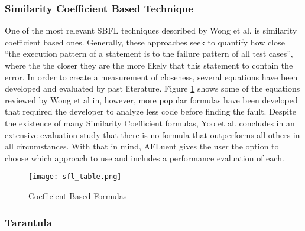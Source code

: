 \subsubsection{Similarity Coefficient Based Technique}
\label{subsubsec:coefficient_based}

One of the most relevant SBFL techniques described by Wong et al.
\cite{wong2016survey} is similarity coefficient based ones. Generally, these approaches
seek to quantify how close ``the execution pattern of a statement is to the
failure pattern of all test cases'', where the the closer they are the more
likely that this statement to contain the error. In order to create a
measurement of closeness, several equations have been developed and evaluated by
past literature. Figure \ref{fig:sbfl_eq} shows some of the equations reviewed by
Wong et al in, however, more popular formulas have been developed that
required the developer to analyze less code before finding the fault. Despite
the existence of many Similarity Coefficient formulas, Yoo et al.
\cite{yoo2014no} concludes in an extensive evaluation study that there is no
formula that outperforms all others in all circumstances. With that in mind,
AFLuent gives the user the option to choose which approach to use and includes
a performance evaluation of each.

\begin{figure}[!htb]
	\begin{center}
		\texttt{[image: sfl\_table.png]}
		\caption{\label{fig:sbfl_eq} Coefficient Based Formulas \cite{wong2016survey}}
	\end{center}
\end{figure}

\subsubsection{Tarantula}
\label{subsubsec:tarantula_lit}

